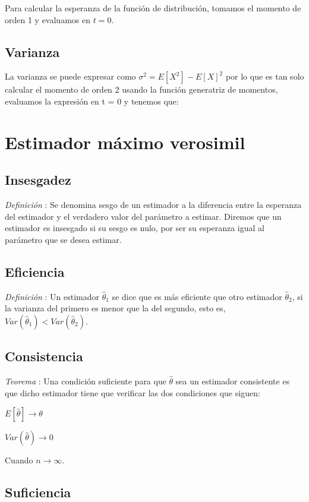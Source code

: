 \documentclass[a4paper, 10pt]{article} %
\newcounter{def}
\newcounter{teo}
\begin{document}
Para calcular la esperanza de la función de distribución, tomamos el momento de orden 1 y evaluamos en $t = 0$. 

\subsection{Varianza}

La varianza se puede expresar como $\sigma^2 = E[X^2] - E[X]^2$ por lo que es tan solo calcular el momento de
orden 2 usando la función generatriz de momentos, evaluamos la expresión en t = 0 y tenemos que:

\section{Estimador máximo verosimil}

\subsection{Insesgadez}
\addtocounter{def}{1}
\emph{Definición }: Se denomina sesgo de un estimador a la diferencia entre la esperanza del estimador
y el verdadero valor del parámetro a estimar. Diremos que un estimador es insesgado si su sesgo es nulo, por ser
su esperanza igual al parámetro que se desea estimar.

\subsection{Eficiencia}
\addtocounter{def}{1}
\emph{Definición }: Un estimador $\hat{\theta}_1$ se dice que es más eficiente que otro estimador
$\hat{\theta}_2$, si la varianza del primero es menor que la del segundo, esto es,  $Var(\hat{\theta}_1)<Var(\hat{\theta}_2)$.

\subsection{Consistencia}
\addtocounter{teo}{1}
\emph{Teorema }: Una condición suficiente para que $\hat{\theta}$ sea un estimador consistente es que
dicho estimador tiene que verificar las dos condiciones que siguen:

\begin{description}
\item $E[\hat{\theta}] \rightarrow \theta$
\item $Var(\hat{\theta}) \rightarrow 0$
\end{description}
Cuando $n \rightarrow \infty$.

\subsection{Suficiencia}
\end{document}
